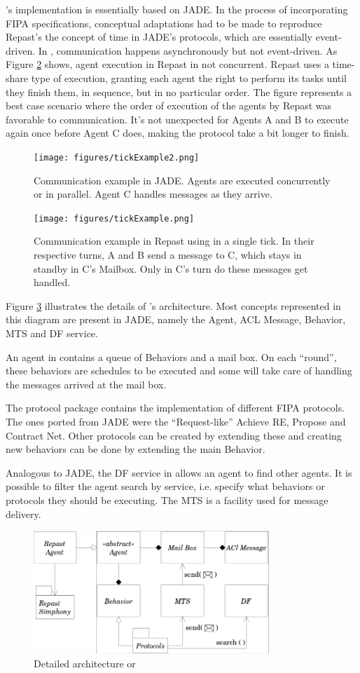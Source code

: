 \apiname{}'s implementation is essentially based on JADE. In the process of incorporating FIPA specifications, conceptual adaptations had to be made to reproduce Repast's the concept of time in JADE's protocols, which are essentially event-driven. In \apiname{}, communication happens asynchronously but not event-driven. As Figure \ref{fig:com-example} shows, agent execution in Repast in not concurrent. Repast uses a time-share type of execution, granting each agent the right to perform its tasks until they finish them, in sequence, but in no particular order. The figure represents a best case scenario where the order of execution of the agents by Repast was favorable to communication. It's not unexpected for Agents A and B to execute again once before Agent C does, making the protocol take a bit longer to finish.

\begin{figure}[h]
	\centering
	\texttt{[image: figures/tickExample2.png]}
	\caption{
		Communication example in JADE. Agents are executed concurrently or in parallel. Agent C handles messages as they arrive.
	}
	\label{fig:com-example-jade}
\end{figure}

\begin{figure}[h]
	\centering
	\texttt{[image: figures/tickExample.png]}
	\caption{
		Communication example in Repast using \apiname{} in a single tick. In their respective turns, A and B send a message to C, which stays in standby in C's Mailbox. Only in C's turn do these messages get handled.
	}
	\label{fig:com-example}
\end{figure}


Figure \ref{fig:arch} illustrates the details of \apiname{}'s architecture. Most concepts represented in this diagram are present in JADE, namely the Agent, ACL Message, Behavior, MTS and DF service.

An agent in \apiname{} contains a queue of Behaviors and a mail box. On each ``round'', these behaviors are schedules to be executed and some will take care of handling the messages arrived at the mail box.

The protocol package contains the implementation of different FIPA protocols. The ones ported from JADE were the ``Request-like'' Achieve RE, Propose and Contract Net. Other protocols can be created by extending these and creating new behaviors can be done by extending the main Behavior.

Analogous to JADE, the DF service in \apiname{} allows an agent to find other agents. It is possible to filter the agent search by service, i.e. specify what behaviors or protocols they should be executing. The MTS is a facility used for message delivery.


\begin{figure}[h]
	\centering
	\includegraphics[width=3.5in]{figures/repacl_arch.png}
	\caption{Detailed architecture or \apiname{}}
	\label{fig:arch}
\end{figure}

